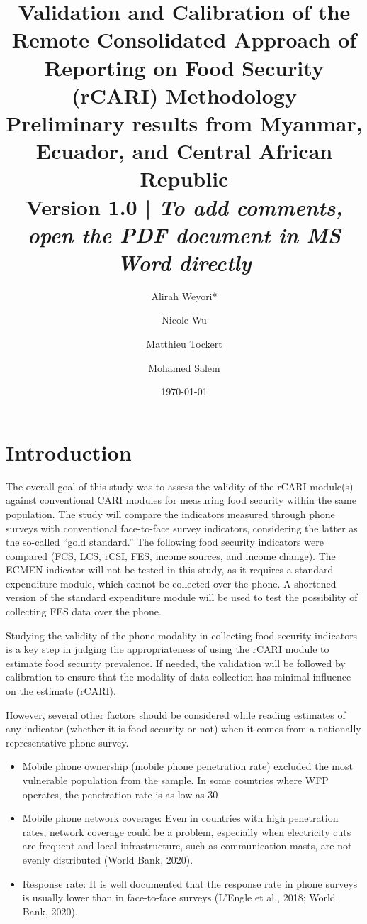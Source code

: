 \documentclass[11pt,harvard]{article}
\author{Alirah Weyori*  \and   Nicole Wu  \and  Matthieu Tockert  \and  Mohamed Salem}
\date{\today}
\title{Validation and Calibration of the Remote Consolidated Approach of Reporting on Food Security (rCARI) Methodology 
	\\ {\normalsize Preliminary results from Myanmar, Ecuador, and Central African Republic} 
	\\{\normalsize{Version 1.0}} | \emph{{\normalsize{To add comments, open the PDF document in MS Word directly}} }}
\begin{document}
	\maketitle \vspace{-1cm}
	\onehalfspacing
	\pagebreak
	\setlength{\parskip}{8pt} %
	
	\section{Introduction}
	The overall goal of this study was to assess the validity of the rCARI module(s) against conventional CARI modules for measuring food security within the same population. The study will compare the indicators measured through phone surveys with conventional face-to-face survey indicators, considering the latter as the so-called “gold standard.” The following food security indicators were compared (FCS, LCS, rCSI, FES, income sources, and income change). The ECMEN indicator will not be tested in this study, as it requires a standard expenditure module, which cannot be collected over the phone. A shortened version of the standard expenditure module will be used to test the possibility of collecting FES data over the phone.
	
	Studying the validity of the phone modality in collecting food security indicators is a key step in judging the appropriateness of using the rCARI module to estimate food security prevalence. If needed, the validation will be followed by calibration to ensure that the modality of data collection has minimal influence on the estimate (rCARI).
	
	However, several other factors should be considered while reading estimates of any indicator (whether it is food security or not) when it comes from a nationally representative phone survey.
	
	\begin{itemize}[label=--, left=1.5em]
		\item Mobile phone ownership (mobile phone penetration rate) excluded the most vulnerable population from the sample. In some countries where WFP operates, the penetration rate is as low as 30%
		\item Mobile phone network coverage: Even in countries with high penetration rates, network coverage could be a problem, especially when electricity cuts are frequent and local infrastructure, such as communication masts, are not evenly distributed (World Bank, 2020).
		\item Response rate: It is well documented that the response rate in phone surveys is usually lower than in face-to-face surveys (L’Engle et al., 2018; World Bank, 2020).
	\end{itemize}
	
\end{document}
